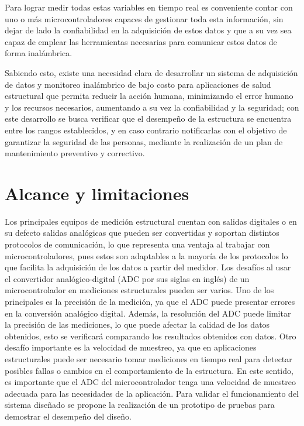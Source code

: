 Para lograr medir todas estas variables en tiempo real es conveniente contar con uno o más microcontroladores capaces de gestionar toda esta información, sin dejar de lado la confiabilidad en la adquisición de estos datos y que a su vez sea capaz de emplear las herramientas necesarias para comunicar estos datos de forma inalámbrica.

Sabiendo esto, existe una necesidad clara de desarrollar un sistema de adquisición de datos y monitoreo inalámbrico de bajo costo para aplicaciones de salud estructural que permita reducir la acción humana, minimizando el error humano y los recursos necesarios, aumentando a su vez la confiabilidad y la seguridad; con este desarrollo se busca verificar que el desempeño de la estructura se encuentra entre los rangos establecidos, y en caso contrario notificarlas con el objetivo de garantizar la seguridad de las personas, mediante la realización de un plan de mantenimiento preventivo y correctivo.

\section{Alcance y limitaciones}

Los principales equipos de medición estructural cuentan con salidas digitales o en su defecto salidas analógicas que pueden ser convertidas y soportan distintos protocolos de comunicación, lo que representa una ventaja al trabajar con microcontroladores, pues estos son adaptables a la mayoría de los protocolos lo que facilita la adquisición de los datos a partir del medidor.
Los desafíos al usar el convertidor analógico-digital (ADC por sus siglas en inglés) de un microcontrolador en mediciones estructurales pueden ser varios. Uno de los principales es la precisión de la medición, ya que el ADC puede presentar errores en la conversión analógico digital. Además, la resolución del ADC puede limitar la precisión de las mediciones, lo que puede afectar la calidad de los datos obtenidos, esto se verificará comparando los resultados obtenidos con datos.
Otro desafío importante es la velocidad de muestreo, ya que en aplicaciones estructurales puede ser necesario tomar mediciones en tiempo real para detectar posibles fallas o cambios en el comportamiento de la estructura. En este sentido, es importante que el ADC del microcontrolador tenga una velocidad de muestreo adecuada para las
necesidades de la aplicación. Para validar el funcionamiento del sistema diseñado se propone la realización de un
prototipo de pruebas para demostrar el desempeño del diseño.

